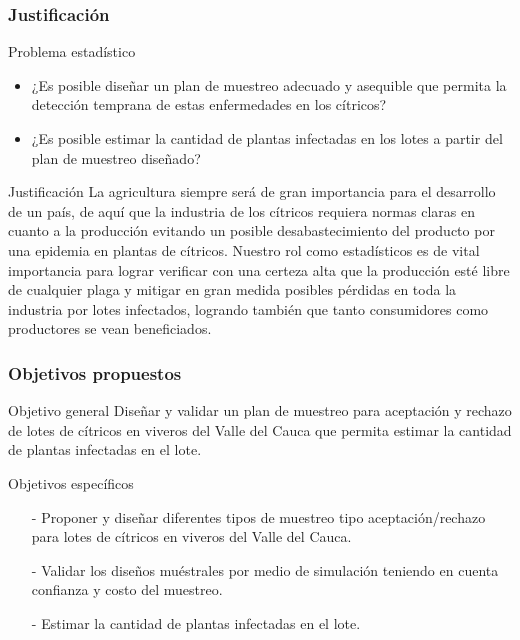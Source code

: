 \documentclass[10.5pt]{beamer}
\begin{document}
\begin{frame}
\frametitle{Justificación}
\begin{block}{Problema estadístico}
\begin{itemize}
\justifying
\item ¿Es posible diseñar un plan de muestreo adecuado y asequible que permita la detección temprana de estas enfermedades en los cítricos?
\item ¿Es posible estimar la cantidad de plantas infectadas en los lotes a partir del plan de muestreo diseñado?
\end{itemize}
\end{block}
\begin{block}{Justificación}
\justifying
La agricultura siempre será de gran importancia para el desarrollo de un país, de aquí que la industria de los cítricos requiera normas claras en cuanto a la producción evitando un posible desabastecimiento del producto por una epidemia en plantas de cítricos. Nuestro rol como estadísticos es de vital importancia para lograr verificar con una certeza alta que la producción esté libre de cualquier plaga y mitigar en gran medida posibles pérdidas en toda la industria por lotes infectados, logrando también que tanto consumidores como productores se vean beneficiados.
\end{block}
\end{frame}

\begin{frame}
\frametitle{Objetivos propuestos}
\begin{block}{Objetivo general}
Diseñar y validar un plan de muestreo para aceptación y rechazo de lotes de cítricos en viveros del Valle del Cauca que permita estimar la cantidad de plantas infectadas en el lote.
\end{block}
\begin{block}{Objetivos específicos}
\begin{itemize}
\justifying
\item[-]Proponer y diseñar diferentes tipos de muestreo tipo aceptación/rechazo para lotes de cítricos en viveros del Valle del Cauca.
\item[-]Validar los diseños muéstrales por medio de simulación teniendo en cuenta confianza y costo del muestreo.
\item[-]Estimar la cantidad de plantas infectadas en el lote.
\end{itemize}
\end{block}
\end{frame}
\end{document}
